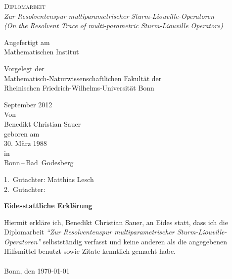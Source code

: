 \documentclass[paper=a4,twoside,parskip=full]{scrartcl}
\author{Benedikt Christian Sauer}
\title{\Thema}
\numberwithin{equation}{section}
\numberwithin{theorem}{section}
\numberwithin{Remark}{section}
\numberwithin{Lemma}{section}
\newcommand{\Thema}{Zur Resolventenspur multiparametrischer
Sturm-Liouville-Operatoren}
\newcommand{\ThemaEn}{On the Resolvent Trace of multi-parametric Sturm-Liouville
Operators}
\begin{document}
\begin{titlepage}
  \begin{center}
      \textsc{Diplomarbeit} \\
      \bigskip
      \textit{\Thema} \\
      \textit{(\ThemaEn)}
  \end{center}
  \begin{center}
      Angefertigt am \\
      Mathematischen Institut
  \end{center}
  \begin{center}
      Vorgelegt der \\
      Mathematisch-Naturwissenschaftlichen Fakultät der \\
      Rheinischen Friedrich-Wilhelms-Universität Bonn
  \end{center}
  \begin{center}
      September 2012 \\
      \bigskip
      Von \\
      \bigskip
      Benedikt Christian Sauer \\
      \bigskip
      geboren am \\
      30. März 1988 \\
      in \\
      Bonn\,--\,Bad~Godesberg
  \end{center}
\end{titlepage}
\newpage
\tableofcontents
\vfill
\begin{center}
  \large 1.\ Gutachter: Matthias Lesch \\
  \large 2.\ Gutachter: \\
\end{center}
\newpage
{}








\appendix


\newpage
{}
\pagestyle{plain}
\begin{center}
    \textbf{\large Eidesstattliche Erklärung}
\end{center}
\vspace{2cm}
Hiermit erkläre ich, Benedikt Christian Sauer, an Eides statt, dass ich die
Diplomarbeit \textit{"`\Thema"'} selbstständig verfasst und keine anderen als
die angegebenen Hilfsmittel benutzt sowie Zitate kenntlich gemacht habe. \\
\vspace{2cm} \\
Bonn, den \today
\end{document}
